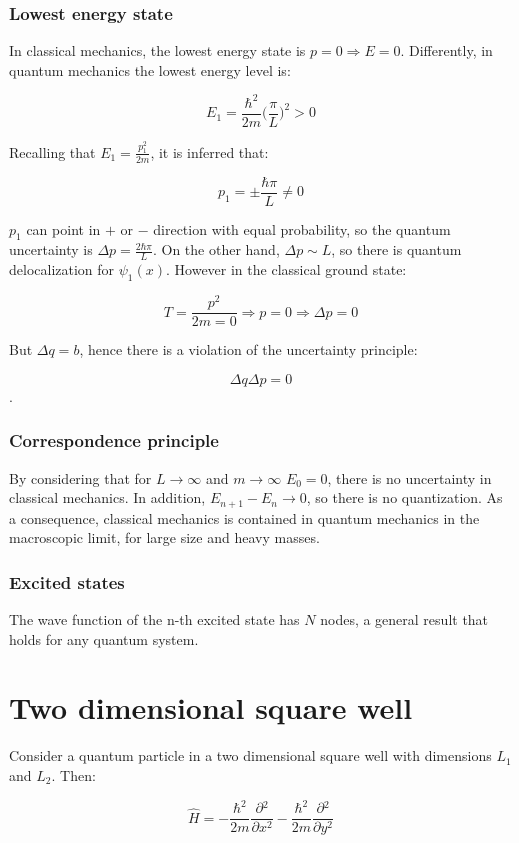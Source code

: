     \subsubsection{Lowest energy state}
    In classical mechanics, the lowest energy state is $p = 0\Rightarrow E = 0$. 
    Differently, in quantum mechanics the lowest energy level is:

    $$E_1 = \frac{\hbar^2}{2m}\biggl(\frac{\pi}{L}\biggr)^2 > 0$$

    Recalling that $E_1 = \frac{p_1^2}{2m}$, it is inferred that:

    $$p_1 = \pm \frac{\hbar\pi}{L}\neq 0$$

    $p_1$ can point in $+$ or $-$ direction with equal probability, so the quantum uncertainty is $\Delta p =\frac{2\hbar\pi}{L}$.
    On the other hand, $\Delta p \sim L$, so there is quantum delocalization for $\psi_1(x)$.
    However in the classical ground state:

    $$T = \frac{p^2}{2m = 0}\Rightarrow p = 0\Rightarrow \Delta p = 0$$

    But $\Delta q = b$, hence there is a violation of the uncertainty principle:

    $$\Delta q\Delta p = 0$$.

    \subsubsection{Correspondence principle}
    By considering that for $L\rightarrow\infty$ and $m\rightarrow\infty$ $E_0 = 0$, there is no uncertainty in classical mechanics. In addition, $E_{n+1}-E_n \rightarrow 0$, so there is no quantization.
    As a consequence, classical mechanics is contained in quantum mechanics in the macroscopic limit, for large size and heavy masses.

    \subsubsection{Excited states}
    The wave function of the n-th excited state has $N$ nodes, a general result that holds for any quantum system.

\section{Two dimensional square well}
Consider a quantum particle in a two dimensional square well with dimensions $L_1$ and $L_2$.
Then:

$$\hat{H} = -\frac{\hbar^2}{2m}\frac{\partial {^2}}{\partial {x^2}}-\frac{\hbar^2}{2m}\frac{\partial {^2}}{\partial {y^2}}$$

